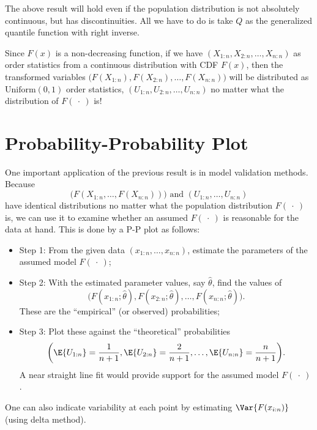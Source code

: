 \begin{Remark}{}{}
    The above result will hold even if the population distribution
    is not absolutely continuous, but has discontinuities.
    All we have to do is take $ Q $ as the generalized quantile
    function with right inverse.

    Since $ F(x) $ is a non-decreasing function, if we have
    $ (X_{1:n},X_{2:n},\ldots,X_{n:n}) $ as order statistics
    from a continuous distribution with CDF $ F(x) $, then the
    transformed variables $ \bigl(F(X_{1:n}),F(X_{2:n}),\ldots,F(X_{n:n})\bigr) $
    will be distributed as $ \text{Uniform}(0,1) $ order statistics,
    $ (U_{1:n},U_{2:n},\ldots,U_{n:n}) $ no matter what the distribution
    of $ F(\:\cdot\:) $ is!
\end{Remark}

\section*{Probability-Probability Plot}
One important application of the previous result is in model validation methods.
Because
\[ \bigl(F(X_{1:n},\ldots,F(X_{n:n}))\bigr)\text{ and }
    (U_{1:n},\ldots,U_{n:n}) \]
have identical distributions no matter what the population
distribution $  F(\:\cdot\:) $ is, we can use it to examine whether an
assumed $  F(\:\cdot\:) $ is reasonable for the data at hand. This is done by a
P-P plot as follows:
\begin{itemize}
    \item Step 1: From the given data $ (x_{1:n},\ldots,x_{n:n}) $,
          estimate the parameters of the assumed model $  F(\:\cdot\:) $;
    \item Step 2: With the estimated parameter values,
          say $ \hat{\theta} $, find the values of
          \[ \bigl(F(x_{1:n};\hat{\theta}),F(x_{2:n};\hat{\theta}),\ldots,
              F(x_{n:n};\hat{\theta})\bigr). \]
          These are the ``empirical'' (or observed) probabilities;
    \item Step 3: Plot these against the ``theoretical''
          probabilities
          \[ \biggl(\E{U_{1:n}}=\frac{1}{n+1},\E{U_{2:n}}=\frac{2}{n+1},\ldots,
              \E{U_{n:n}}=\frac{n}{n+1}\biggr). \]
          A near straight line fit would provide support for the assumed model
          $  F(\:\cdot\:) $.
\end{itemize}
\begin{Remark}{}{}
    One can also indicate variability at each point by estimating
    $ \Var{F(x_{i:n})} $ (using delta method).
\end{Remark}
